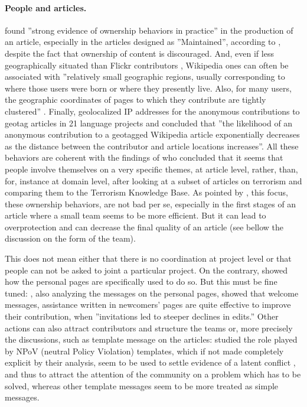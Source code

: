 
\paragraph{People and articles.}

\citet{Halfakeretal09} found ''strong evidence of ownership behaviors
in practice'' in the production of an article, especially in the
articles designed as ''Maintained'', according to \citet{Thom-SantelliCosleyGay09},
despite the fact that ownership of content is discouraged. And, even
if less geographically situated than Flickr contributors \citep{HechtGergle10b},
Wikipedia ones can often be associated with ''relatively small geographic
regions, usually corresponding to where those users were born or where
they presently live. Also, for many users, the geographic coordinates
of pages to which they contribute are tightly clustered'' \citep{LiebermanLin09}.
Finally, \citet{HardyFrewGoodchild12} geolocalized IP addresses for
the anonymous contributions to geotag articles in 21 language projects
and concluded that ''the likelihood of an anonymous contribution
to a geotagged Wikipedia article exponentially decreases as the distance
between the contributor and article locations increases''. All these
behaviors are coherent with the findings of \citet{Zhangetal10} who
concluded that it seems that people involve themselves on a very specific
themes, at article level, rather, than, for, instance at domain level,
after looking at a subset of articles on terrorism and comparing them
to the Terrorism Knowledge Base. As pointed by \citet{Thom-SantelliCosleyGay09},
this focus, these ownership behaviors, are not bad per se, especially
in the first stages of an article where a small team seems to be more
efficient. But it can lead to overprotection and can decrease the
final quality of an article (see bellow the discussion on the form
of the team).

This does not mean either that there is no coordination at project
level or that people can not be asked to joint a particular project.
On the contrary, \citet{Zhuetal11} showed how the personal pages
are specifically used to do so. But this must be fine tuned: \citet{Choietal10},
also analyzing the messages on the personal pages, showed that welcome
messages, assistance written in newcomers' pages are quite effective
to improve their contribution, when ''invitations led to steeper
declines in edits.'' Other actions can also attract contributors
and structure the teams or, more precisely the discussions, such as
template message on the articles: \citet{Rossietal10} studied the
role played by NPoV (neutral Policy Violation) templates, which if
not made completely explicit by their analysis, seem to be used to
settle evidence of a latent conflict \citep{DenBestenetal10}, and
thus to attract the attention of the community on a problem which
has to be solved, whereas other template messages seem to be more
treated as simple messages.

